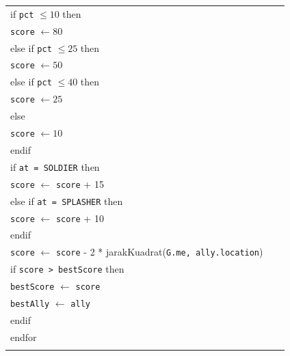 \documentclass{article}
\newenvironment{pseudobox}
{
\centering
\begin{longtable}{|p{0.94\linewidth}|}
\hline
}
{
\\ \hline
\end{longtable}
\vspace{0.05cm}
}
\begin{document}
\begin{enumerate}[label=\alph*.]
\begin{enumerate}[label=\alph*.]
\begin{pseudobox}
\hspace*{3em}if \texttt{pct} $\leq 10$ then \\
\hspace*{4.5em}\texttt{score} $\leftarrow 80$ \\
\hspace*{3em}else if \texttt{pct} $\leq 25$ then \\
\hspace*{4.5em}\texttt{score} $\leftarrow 50$ \\
\hspace*{3em}else if \texttt{pct} $\leq 40$ then \\
\hspace*{4.5em}\texttt{score} $\leftarrow 25$ \\
\hspace*{3em}else \\
\hspace*{4.5em}\texttt{score} $\leftarrow 10$ \\
\hspace*{3em}endif \\

\hspace*{3em}if \texttt{at = SOLDIER} then \\
\hspace*{4.5em}\texttt{score} $\leftarrow$ \texttt{score} + 15 \\
\hspace*{3em}else if \texttt{at = SPLASHER} then \\
\hspace*{4.5em}\texttt{score} $\leftarrow$ \texttt{score} + 10 \\
\hspace*{3em}endif \\

\hspace*{3em}\texttt{score} $\leftarrow$ \texttt{score} - 2 * jarakKuadrat(\texttt{G.me, ally.location}) \\

\hspace*{3em}if \texttt{score > bestScore} then \\
\hspace*{4.5em}\texttt{bestScore} $\leftarrow$ \texttt{score} \\
\hspace*{4.5em}\texttt{bestAlly} $\leftarrow$ \texttt{ally} \\
\hspace*{3em}endif \\
\hspace*{1.5em}endfor \\


\end{pseudobox}
\end{enumerate}
\end{enumerate}
\end{document}

